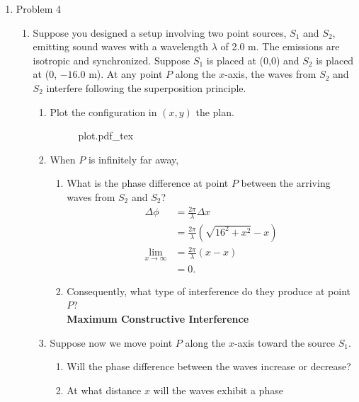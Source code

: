 \documentclass{article}
\newcommand{\incfig}[2][1]{%
    \def\svgwidth{#1\columnwidth}
    {#2.pdf_tex}
}
\begin{document}
\begin{enumerate}
  \item Problem 4
    \begin{enumerate}
      \item Suppose you designed a setup involving two point sources, $S_1$ and
        $S_2$, emitting sound waves with a wavelength $\lambda$ of 2.0 m. The emissions
        are isotropic and synchronized. Suppose $S_1$ is placed at (0,0) and $S_2$ is
        placed at (0, $-16.0$ m). At any point $P$ along the $x$-axis, the waves from
        $S_2$ and $S_2$ interfere following the superposition principle.
        \begin{enumerate}
          \item Plot the configuration in $(x,y)$ the plan.
            \begin{figure}[ht]
              \centering
              \incfig{plot}
              \caption{}
              \label{fig:plot}
            \end{figure}
          \item When $P$ is infinitely far away,
            \begin{enumerate}
              \item What is the phase difference at point $P$ between the
                arriving waves from $S_2$ and $S_2$?
                \begin{align}
                  \Delta \phi &= \frac{2\pi}{\lambda}\Delta x \\
                              &= \frac{2\pi}{\lambda}\left( \sqrt{16^2+x^2} -x \right) \\
                  \lim_{x \to \infty} &= \frac{2\pi}{\lambda}\left( x -x \right) \\
                                      &= 0
                .\end{align}
              \item Consequently, what type of interference do they produce
                at point $P$?
                \\\bf{Maximum Constructive Interference}
            \end{enumerate}
          \item Suppose now we move point $P$ along the $x$-axis toward the source $S_1$.
            \begin{enumerate}
              \item Will the phase difference between the waves increase or
                decrease?
              \item At what distance $x$ will the waves exhibit a phase

\end{enumerate}
\end{enumerate}
\end{enumerate}
\end{enumerate}
\end{document}
